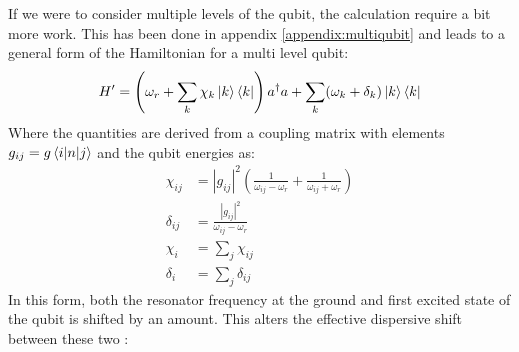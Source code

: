 If we were to consider multiple levels of the qubit, the calculation require a  bit more work. This has been done in appendix \ref{appendix:multiqubit} and leads to a general form of the Hamiltonian for a multi level qubit:
\begin{equation}\label{eq:multi_qubit_dispersive_hamiltonian}
    H' = \left(\omega_r + \sum_k \chi_k \ket{k}\bra{k} \right) a^\dagger a + \sum_k (\omega_k + \delta_k)\ket{k}\bra{k}
\end{equation}
Where the quantities are derived from a coupling matrix with elements $g_{ij} = g \mel{i}{n}{j}$ and the qubit energies as:
\begin{align}
    \chi_{ij} &= |g_{ij}|^2 \left(\frac{1}{\omega_{ij} - \omega_r} + \frac{1}{\omega_{ij} + \omega_r} \right) \\
    \delta_{ij} &= \frac{|g_{ij}|^2 }{\omega_{ij} - \omega_r} \\
    \chi_{i} &= \sum_j \chi_{ij} \\
    \delta_{i} &= \sum_j \delta_{ij} 
\end{align}
In this form, both the resonator frequency at the ground and first excited state of the qubit is shifted by an amount. This alters the effective dispersive shift between these two \cite{krantz_quantum_2019}:

